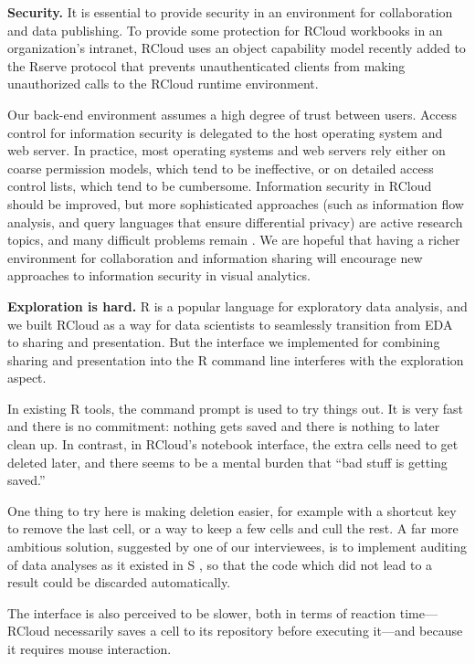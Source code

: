 {\bf Security.}
It is essential to provide security in an environment for
collaboration and data publishing. To provide some
protection for RCloud workbooks in an organization's intranet,
RCloud uses an object capability model
\cite{Miller:2006:RCT}
recently added to the Rserve protocol \cite{Urbanek:2003:AFW}
that prevents unauthenticated clients from making
unauthorized calls to the RCloud runtime environment.

Our back-end environment assumes a high degree of trust between users.
Access control for information security is delegated to the host
operating system and web server. In practice, most operating
systems and web servers rely either on coarse permission models,
which tend to be ineffective, or on detailed access control
lists, which tend to be cumbersome.
Information security in RCloud should be improved, but more
sophisticated approaches (such as information flow analysis,
and query languages that ensure differential privacy) are
active research topics, and many difficult problems remain
\cite{Moore:2011:SAF}. We are hopeful that having a richer
environment for collaboration and information sharing will encourage
new approaches to information security in visual analytics.

{\bf Exploration is hard.}
R is a popular language for exploratory data analysis, and we built RCloud
as a way for data scientists to seamlessly transition from EDA to sharing
and presentation. But the interface we implemented for combining sharing and presentation
into the R command line interferes with the exploration aspect.

In existing R tools, the command prompt is used to try things out. It is very
fast and there is no commitment: nothing gets saved and there is nothing to
later clean up. In contrast, in RCloud's notebook interface, the extra cells need
to get deleted later, and there seems to be a mental burden that ``bad stuff
is getting saved.''

One thing to try here is making deletion easier, for example with a
shortcut key to remove the last cell, or a way to keep a few cells and cull
the rest. A far more ambitious solution, suggested by one of our
interviewees, is to implement auditing of data analyses as it existed in
S \cite{Becker:1988:Auditing}, so that the code which did not lead to a
result could be discarded automatically.

The interface is also perceived to be slower, both in terms of reaction
time---RCloud necessarily saves a cell to its repository before executing
it---and because it requires mouse interaction.

